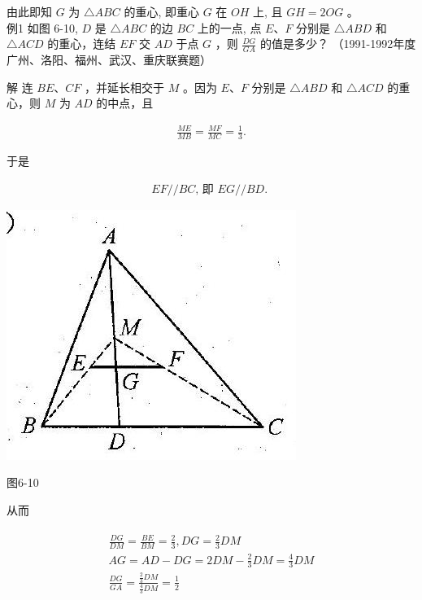 \documentclass[10pt]{article}
\begin{document}
由此即知 $G$ 为 $\triangle A B C$ 的重心, 即重心 $G$ 在 $O H$ 上, 且 $G H=2 O G$ 。\\
例1 如图 6-10, $D$ 是 $\triangle A B C$ 的边 $B C$ 上的一点, 点 $E 、 F$ 分别是 $\triangle A B D$ 和 $\triangle A C D$ 的重心，连结 $E F$ 交 $A D$ 于点 $G$ ，则 $\frac{D G}{G A}$ 的值是多少？ （1991-1992年度广州、洛阳、福州、武汉、重庆联赛题）

解 连 $B E 、 C F$ ，并延长相交于 $M$ 。因为 $E 、 F$ 分别是 $\triangle A B D$ 和 $\triangle A C D$ 的重心，则 $M$ 为 $A D$ 的中点，且

\begin{align*}
\frac{M E}{M B}=\frac{M F}{M C}=\frac{1}{3} .
\end{align*}

于是

\begin{align*}
E F / / B C \text {, 即 } E G / / B D \text {. }
\end{align*}

\begin{center}
\includegraphics[max width=\textwidth]{2024_10_30_2c8f45efd4a519b08e1ag-065}
\end{center}

图6-10

从而

\begin{align*}
\begin{gathered}
\frac{D G}{D M}=\frac{B E}{B M}=\frac{2}{3}, D G=\frac{2}{3} D M \\
A G=A D-D G=2 D M-\frac{2}{3} D M=\frac{4}{3} D M \\
\frac{D G}{G A}=\frac{\frac{2}{3} D M}{\frac{4}{3} D M}=\frac{1}{2}
\end{gathered}
\end{align*}
\end{document}
